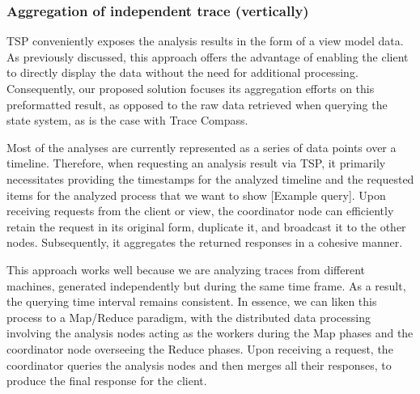 

\subsubsection{Aggregation of independent trace (vertically)}

TSP conveniently exposes the analysis results in the form of a view model data. As previously discussed, this approach offers the advantage of enabling the client to directly display the data without the need for additional processing. Consequently, our proposed solution focuses its aggregation efforts on this preformatted result, as opposed to the raw data retrieved when querying the state system, as is the case with Trace Compass.

Most of the analyses are currently represented as a series of data points over a timeline. Therefore, when requesting an analysis result via TSP, it primarily necessitates providing the timestamps for the analyzed timeline and the requested items for the analyzed process that we want to show [Example query]. Upon receiving requests from the client or view, the coordinator node can efficiently retain the request in its original form, duplicate it, and broadcast it to the other nodes. Subsequently, it aggregates the returned responses in a cohesive manner.

This approach works well because we are analyzing traces from different machines, generated independently but during the same time frame. As a result, the querying time interval remains consistent. In essence, we can liken this process to a Map/Reduce paradigm, with the distributed data processing involving the analysis nodes acting as the workers during the Map phases and the coordinator node overseeing the Reduce phases. Upon receiving a request, the coordinator queries the analysis nodes and then merges all their responses, to produce the final response for the client. 

